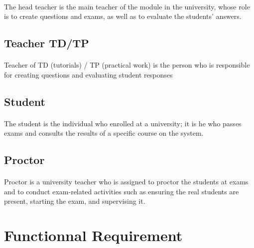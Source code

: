 \documentclass[]{uc2pfecaneva}
\begin{document}
    \paragraph{}
    The head teacher is the main teacher of the module in the university, whose role is to create questions and exams, as well as to evaluate the students' answers.

    \raggedright\subsection{Teacher TD/TP}
    \paragraph{}
    Teacher of TD (tutorials) / TP (practical work) is the person who is responsible for creating questions and evaluating student responses


    \raggedright\subsection{Student}
    \paragraph{}
    The student is the individual who enrolled at a university; it is he who passes exams and consults the results of a specific course on the system.

    \raggedright\subsection{Proctor}
    \paragraph{}
    Proctor is a university teacher who is assigned to proctor the students at exams and to conduct exam-related activities such as ensuring the real students are present, starting the exam, and supervising it.

    \raggedright\section{Functionnal Requirement}
\end{document}
